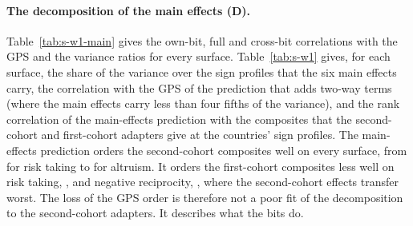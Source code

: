 \documentclass[12pt]{article}
\begin{document}
\paragraph{The decomposition of the main effects (D).} Table~\ref{tab:s-w1-main} gives the own-bit, full and cross-bit correlations with the GPS and the variance ratios for every surface. Table~\ref{tab:s-w1} gives, for each surface, the share of the variance over the  sign profiles that the six main effects carry, the correlation with the GPS of the prediction that adds two-way terms (where the main effects carry less than four fifths of the variance), and the rank correlation of the main-effects prediction with the composites that the second-cohort and first-cohort adapters give at the countries' sign profiles. The main-effects prediction orders the second-cohort composites well on every surface, from  for risk taking to  for altruism. It orders the first-cohort composites less well on risk taking, , and negative reciprocity, , where the second-cohort effects transfer worst. The loss of the GPS order is therefore not a poor fit of the decomposition to the second-cohort adapters. It describes what the bits do.
\end{document}
